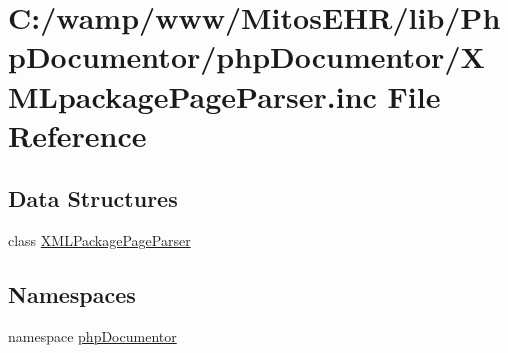 \hypertarget{_x_m_lpackage_page_parser_8inc}{\section{\-C\-:/wamp/www/\-Mitos\-E\-H\-R/lib/\-Php\-Documentor/php\-Documentor/\-X\-M\-Lpackage\-Page\-Parser.inc \-File \-Reference}
\label{_x_m_lpackage_page_parser_8inc}
}
\subsection*{\-Data \-Structures}
\begin{DoxyCompactItemize}
\item 
class \hyperlink{class_x_m_l_package_page_parser}{\-X\-M\-L\-Package\-Page\-Parser}
\end{DoxyCompactItemize}
\subsection*{\-Namespaces}
\begin{DoxyCompactItemize}
\item 
namespace \hyperlink{namespacephp_documentor}{php\-Documentor}
\end{DoxyCompactItemize}
